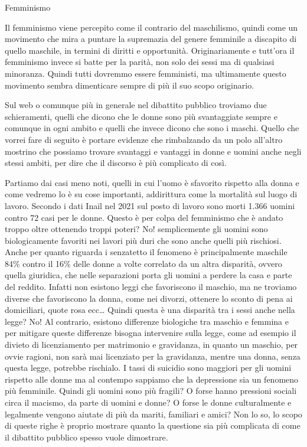 \documentclass[12pt]{book} %
\begin{document}
\bigskip
\begin{mdframed}[linewidth=1pt]
Femminismo

Il femminismo viene percepito come il contrario del maschilismo, quindi come un movimento che mira a puntare la
supremazia del genere femminile a discapito di quello maschile, in termini di diritti e opportunità. Originariamente e
tutt'ora il femminismo invece si batte per la parità, non solo dei sessi ma di qualsiasi
minoranza. Quindi tutti dovremmo essere femministi, ma ultimamente questo movimento sembra dimenticare sempre di più il
suo scopo originario. 

Sul web o comunque più in generale nel dibattito pubblico troviamo due schieramenti, quelli che dicono che le donne sono
più svantaggiate sempre e comunque in ogni ambito e quelli che invece dicono che sono i maschi. Quello che vorrei fare
di seguito è portare evidenze che rimbalzando da un polo all'altro mostrino che possiamo trovare
svantaggi e vantaggi in donne e uomini anche negli stessi ambiti, per dire che il discorso è più complicato di così. 

Partiamo dai casi meno noti, quelli in cui l'uomo è sfavorito rispetto alla donna e come vedremo lo
è su cose importanti, addirittura come la mortalità sul luogo di lavoro. Secondo i dati
Inail nel 2021 sul posto di
lavoro sono morti 1.366 uomini contro 72 casi per le donne. Questo è per colpa del femminismo che è andato troppo oltre
ottenendo troppi poteri? No! semplicemente gli uomini sono biologicamente favoriti nei lavori più duri che sono anche
quelli più rischiosi. Anche per quanto riguarda i senzatetto il fenomeno è principalmente maschile 84\% contro il 16\%
delle donne a volte correlato da un altra disparità, ovvero quella
giuridica, che nelle separazioni porta gli uomini a perdere la casa e parte del reddito. Infatti non esistono leggi che
favoriscono il maschio, ma ne troviamo diverse che favoriscono la donna, come nei divorzi, ottenere lo sconto di pena
ai domiciliari, quote rosa ecc… Quindi questa è una disparità tra i sessi anche nella legge? No! Al contrario, esistono
differenze biologiche tra maschio e femmina e per mitigare queste differenze bisogna intervenire sulla legge, come ad
esempio il divieto di licenziamento per matrimonio e gravidanza, in quanto un maschio, per ovvie ragioni, non sarà mai
licenziato per la gravidanza, mentre una donna, senza questa legge, potrebbe rischialo. I tassi di suicidio sono
maggiori per gli uomini rispetto alle donne ma al contempo sappiamo che la depressione sia un fenomeno più femminile.
Quindi gli uomini sono più fragili? O forse hanno pressioni sociali circa il macismo, da parte di uomini e donne? O
forse le donne culturalmente e legalmente vengono aiutate di più da mariti, familiari e amici? Non lo so, lo scopo di
queste righe è proprio mostrare quanto la questione sia più complicata di come il dibattito pubblico spesso vuole
dimostrare. 


\end{mdframed}
\end{document}
